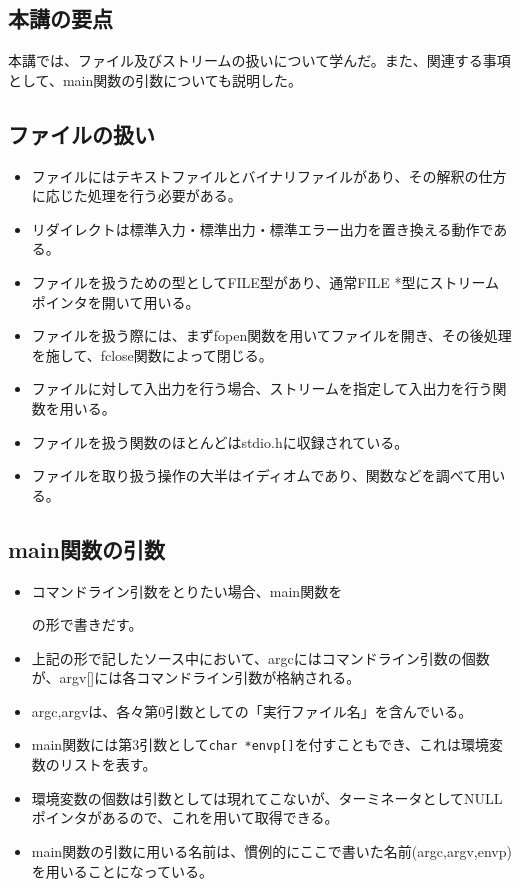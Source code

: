 \begin{shadebox}
\section*{本講の要点}
本講では、ファイル及びストリームの扱いについて学んだ。また、関連する事項として、main関数の引数についても説明した。
\subsection*{ファイルの扱い}
\begin{itemize}
\item ファイルにはテキストファイルとバイナリファイルがあり、その解釈の仕方に応じた処理を行う必要がある。
\item リダイレクトは標準入力・標準出力・標準エラー出力を置き換える動作である。
\item ファイルを扱うための型としてFILE型があり、通常FILE *型にストリームポインタを開いて用いる。
\item ファイルを扱う際には、まずfopen関数を用いてファイルを開き、その後処理を施して、fclose関数によって閉じる。
\item ファイルに対して入出力を行う場合、ストリームを指定して入出力を行う関数を用いる。
\item ファイルを扱う関数のほとんどはstdio.hに収録されている。
\item ファイルを取り扱う操作の大半はイディオムであり、関数などを調べて用いる。
\end{itemize}

\subsection*{main関数の引数}
\begin{itemize}
\item コマンドライン引数をとりたい場合、main関数を
\begin{code}
int main(int argc,char *argv[]){
\end{code}
の形で書きだす。
\item 上記の形で記したソース中において、argcにはコマンドライン引数の個数が、argv[]には各コマンドライン引数が格納される。
\item argc,argvは、各々第0引数としての「実行ファイル名」を含んでいる。
\item main関数には第3引数として\verb|char *envp[]|を付すこともでき、これは環境変数のリストを表す。
\item 環境変数の個数は引数としては現れてこないが、ターミネータとしてNULLポインタがあるので、これを用いて取得できる。
\item main関数の引数に用いる名前は、慣例的にここで書いた名前(argc,argv,envp)を用いることになっている。
\end{itemize}
\end{shadebox}

